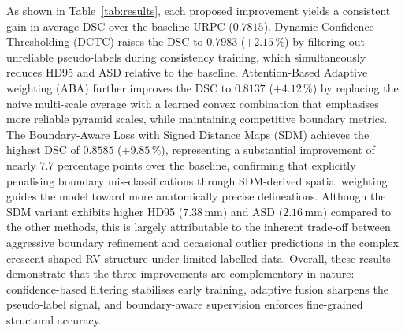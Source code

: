 As shown in Table~\ref{tab:results}, each proposed improvement yields a consistent gain in average DSC over the baseline URPC ($0.7815$). Dynamic Confidence Thresholding (DCTC) raises the DSC to $0.7983$ ($+2.15$\,\%) by filtering out unreliable pseudo-labels during consistency training, which simultaneously reduces HD95 and ASD relative to the baseline. Attention-Based Adaptive weighting (ABA) further improves the DSC to $0.8137$ ($+4.12$\,\%) by replacing the naive multi-scale average with a learned convex combination that emphasises more reliable pyramid scales, while maintaining competitive boundary metrics. The Boundary-Aware Loss with Signed Distance Maps (SDM) achieves the highest DSC of $0.8585$ ($+9.85$\,\%), representing a substantial improvement of nearly 7.7 percentage points over the baseline, confirming that explicitly penalising boundary mis-classifications through SDM-derived spatial weighting guides the model toward more anatomically precise delineations. Although the SDM variant exhibits higher HD95 ($7.38$\,mm) and ASD ($2.16$\,mm) compared to the other methods, this is largely attributable to the inherent trade-off between aggressive boundary refinement and occasional outlier predictions in the complex crescent-shaped RV structure under limited labelled data. Overall, these results demonstrate that the three improvements are complementary in nature: confidence-based filtering stabilises early training, adaptive fusion sharpens the pseudo-label signal, and boundary-aware supervision enforces fine-grained structural accuracy.
